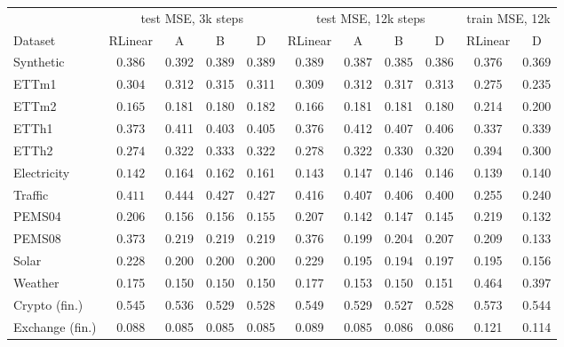 \begin{tabular}{lcccc|cccc|cc}
\toprule
 & \multicolumn{4}{c|}{test MSE, 3k steps} & \multicolumn{4}{c|}{test MSE, 12k steps} & \multicolumn{2}{c}{train MSE, 12k} \\
Dataset & RLinear & A & B & D & RLinear & A & B & D & RLinear & D \\
\midrule
Synthetic & $\mathbf{0.386}$ & 0.392 & 0.389 & 0.389 & 0.389 & 0.387 & $\mathbf{0.385}$ & 0.386 & 0.376 & 0.369 \\
ETTm1 & $\mathbf{0.304}$ & 0.312 & 0.315 & 0.311 & $\mathbf{0.309}$ & 0.312 & 0.317 & 0.313 & 0.275 & 0.235 \\
ETTm2 & $\mathbf{0.165}$ & 0.181 & 0.180 & 0.182 & $\mathbf{0.166}$ & 0.181 & 0.181 & 0.180 & 0.214 & 0.200 \\
ETTh1 & $\mathbf{0.373}$ & 0.411 & 0.403 & 0.405 & $\mathbf{0.376}$ & 0.412 & 0.407 & 0.406 & 0.337 & 0.339 \\
ETTh2 & $\mathbf{0.274}$ & 0.322 & 0.333 & 0.322 & $\mathbf{0.278}$ & 0.322 & 0.330 & 0.320 & 0.394 & 0.300 \\
Electricity & $\mathbf{0.142}$ & 0.164 & 0.162 & 0.161 & $\mathbf{0.143}$ & 0.147 & 0.146 & 0.146 & 0.139 & 0.140 \\
Traffic & $\mathbf{0.411}$ & 0.444 & 0.427 & 0.427 & 0.416 & 0.407 & 0.406 & $\mathbf{0.400}$ & 0.255 & 0.240 \\
PEMS04 & 0.206 & 0.156 & 0.156 & $\mathbf{0.155}$ & 0.207 & $\mathbf{0.142}$ & 0.147 & 0.145 & 0.219 & 0.132 \\
PEMS08 & 0.373 & $\mathbf{0.219}$ & 0.219 & 0.219 & 0.376 & $\mathbf{0.199}$ & 0.204 & 0.207 & 0.209 & 0.133 \\
Solar & 0.228 & 0.200 & $\mathbf{0.200}$ & 0.200 & 0.229 & 0.195 & $\mathbf{0.194}$ & 0.197 & 0.195 & 0.156 \\
Weather & 0.175 & 0.150 & $\mathbf{0.150}$ & 0.150 & 0.177 & 0.153 & $\mathbf{0.150}$ & 0.151 & 0.464 & 0.397 \\
Crypto (fin.) & 0.545 & 0.536 & 0.529 & $\mathbf{0.528}$ & 0.549 & 0.529 & $\mathbf{0.527}$ & 0.528 & 0.573 & 0.544 \\
Exchange (fin.) & 0.088 & 0.085 & $\mathbf{0.085}$ & 0.085 & 0.089 & $\mathbf{0.085}$ & 0.086 & 0.086 & 0.121 & 0.114 \\
\bottomrule
\end{tabular}

